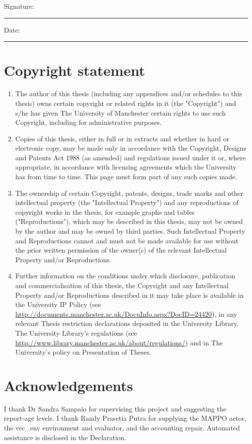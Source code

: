 \documentclass[12pt,a4paper]{article}
\begin{document}
\bigskip
Signature: \rule{60mm}{0.3pt}\qquad Date: \rule{25mm}{0.3pt}
\clearpage
\section*{Copyright statement}
\begin{enumerate}
\item[(i)] The author of this thesis (including any appendices and/or schedules to this thesis) owns certain copyright or related rights in it (the "Copyright") and s/he has given The University of Manchester certain rights to use such Copyright, including for administrative purposes.

\item[(ii)] Copies of this thesis, either in full or in extracts and whether in hard or electronic copy, may be made only in accordance with the Copyright, Designs and Patents Act 1988 (as amended) and regulations issued under it or, where appropriate, in accordance with licensing agreements which the University has from time to time. This page must form part of any such copies made.

\item[(iii)] The ownership of certain Copyright, patents, designs, trade marks and other intellectual property (the "Intellectual Property") and any reproductions of copyright works in the thesis, for example graphs and tables ("Reproductions"), which may be described in this thesis, may not be owned by the author and may be owned by third parties. Such Intellectual Property and Reproductions cannot and must not be made available for use without the prior written permission of the owner(s) of the relevant Intellectual Property and/or Reproductions.

\item[(iv)] Further information on the conditions under which disclosure, publication and commercialisation of this thesis, the Copyright and any Intellectual Property and/or Reproductions described in it may take place is available in the University IP Policy (see \url{http://documents.manchester.ac.uk/DocuInfo.aspx?DocID=24420}), in any relevant Thesis restriction declarations deposited in the University Library, The University Library's regulations (see \url{http://www.library.manchester.ac.uk/about/regulations/}) and in The University's policy on Presentation of Theses.

\end{enumerate}
\section*{Acknowledgements}
I thank Dr Sandra Sampaio for supervising this project and suggesting the report-age levels. I thank Randy Prasetia Putra for supplying the MAPPO actor, the vec\_env environment and evaluator, and the accounting repair. Automated assistance is disclosed in the Declaration.
\clearpage
\end{document}
